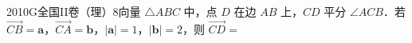 
\begin{problem}{2010}{G}{全国II卷（理）}{8}{向量}
$\triangle ABC$ 中，点 $D$ 在边 $AB$ 上，$CD$ 平分 $\angle ACB$．若 $\overrightarrow{CB}=\boldsymbol{a}$，$\overrightarrow{CA}=\boldsymbol{b}$，$|\boldsymbol{a}|=1$，$|\boldsymbol{b}|=2$，则 $\overrightarrow{CD}=$
\begin{choices}
\end{choices}
\end{problem}